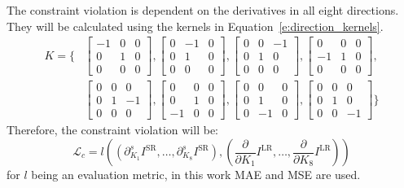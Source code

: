 The constraint violation is dependent on the derivatives in all eight directions.
They will be calculated using the kernels in Equation~\eqref{e:direction_kernels}.
\begin{equation}
    \begin{aligned}
        K = \Biggl\{ 
            &\begin{bmatrix} -1 & 0 & 0 \\ 0 & 1 & 0 \\ 0 & 0 & 0 \end{bmatrix},
            \begin{bmatrix}  0 & -1 & 0 \\ 0 & 1 & 0 \\ 0 & 0 & 0 \end{bmatrix},
            \begin{bmatrix}  0 & 0 & -1 \\ 0 & 1 & 0 \\ 0 & 0 & 0 \end{bmatrix},
            \begin{bmatrix}  0 & 0 & 0 \\ -1 & 1 & 0 \\ 0 & 0 & 0 \end{bmatrix}, \\
            &\begin{bmatrix}  0 & 0 & 0 \\ 0 & 1 & -1 \\ 0 & 0 & 0 \end{bmatrix},
            \begin{bmatrix}  0 & 0 & 0 \\ 0 & 1 & 0 \\ -1 & 0 & 0 \end{bmatrix},
            \begin{bmatrix}  0 & 0 & 0 \\ 0 & 1 & 0 \\ 0 & -1 & 0 \end{bmatrix},
            \begin{bmatrix}  0 & 0 & 0 \\ 0 & 1 & 0 \\ 0 & 0 & -1 \end{bmatrix}
            \Biggr\}
    \end{aligned}
    \label{e:direction_kernels}
\end{equation}
Therefore, the constraint violation will be:
\begin{equation}
    \mathcal{L}_c = l\left( \left( \partial_{K_1}^s I^\text{SR}, \dots, \partial_{K_8}^s I^\text{SR} \right), \left( \frac{\partial}{\partial K_1} I^\text{LR}, \dots, \frac{\partial}{\partial K_8} I^\text{LR}\right) \right)
\end{equation}
for $l$ being an evaluation metric, in this work MAE and MSE are used.

